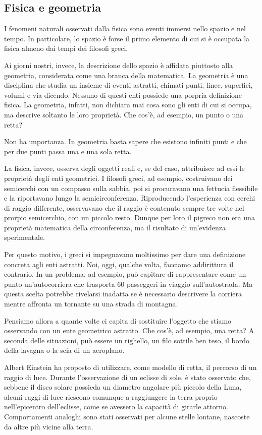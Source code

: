 \subsection*{Fisica e geometria}
I fenomeni naturali osservati dalla fisica sono eventi immersi nello spazio e nel tempo.
In particolare, lo spazio è forse il primo elemento di cui si è occupata la fisica almeno dai tempi dei filosofi greci.

Ai giorni nostri, invece, la descrizione dello spazio è affidata piuttosto alla geometria, considerata come una branca
della matematica.
La geometria è una disciplina che studia un insieme di eventi astratti, chimati punti, linee, superfici, volumi e via
dicendo. Nessuno di questi enti possiede una porpria definizione fisica. La geometria, infatti, non dichiara mai cosa
sono gli enti di cui si occupa, ma descrive soltanto le loro proprietà. Che cos'è, ad esempio, un punto o una retta?

Non ha importanza. In geometria basta sapere  che esistono infiniti punti e che per due punti passa una e una sola
retta.

La fisica, invece, osserva degli oggetti reali e, se del caso, attribuisce ad essi le proprietà degli enti geometrici.
I filosofi greci, ad esempio, costruivano dei semicerchi con un compasso sulla sabbia, poi si procuravano una fettucia
flessibile e la riportavano lungo la semicirconferenza. Riproducendo l'esperienza con cerchi di raggio differente,
osservavano che il raggio è contenuto sempre tre volte nel prorpio semicerchio, con un piccolo resto. Dunque per loro il
pigreco non era una proprietà matematica della circonferenza, ma il risultato di un'evidenza sperimentale.

Per questo motivo, i greci si impegnavano moltissimo per dare una definizione concreta agli enti astratti. Noi, oggi,
qualche volta, facciamo addirittura il contrario. In un problema, ad esempio, può capitare di rappresentare come un
punto un'autocorriera che trasporta 60 passeggeri in viaggio sull'autostrada. Ma questa scelta potrebbe rivelarsi
inadatta se è necessario descrivere la corriera mentre affronta un tornante su una strada di montagna.

Pensiamo allora a quante volte ci capita di sostituire l'oggetto che stiamo osservando con un ente geometrico astratto.
Che cos'è, ad esempio, una retta? A seconda delle situazioni, può essere un righello, un filo sottile ben teso, il
bordo della lavagna o la scia di un aeroplano.

Albert Einstein ha proposto di utilizzare, come modello di retta, il percorso di un raggio di luce. Durante
l'osservazione di un eclisse di sole, è stato osservato che, sebbene il disco solare possieda un diametro angolare più
piccolo della Luna, alcuni raggi di luce riescono comunque a raggiungere la terra proprio nell'epicentro
dell'eclisse, come se avessero la capacità di girarle attorno. Comportamenti analoghi sono stati osservati per alcune
stelle lontane, nascoste da altre più vicine alla terra.

